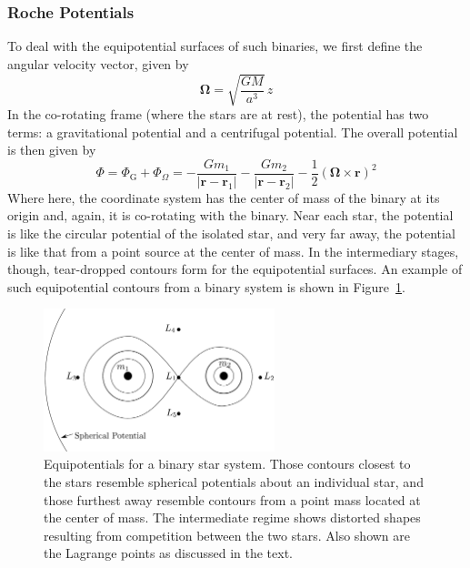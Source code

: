 \documentclass[10pt]{article}
\numberwithin{equation}{section}
\newcommand{\norm}[1]{\left\lvert#1\right\rvert}
\begin{document}
	\subsubsection{Roche Potentials} %
	\label{ssub:roche_potentials}
		To deal with the equipotential surfaces of such binaries, we first define the angular velocity vector, given by
		\begin{equation}
			\label{eq:binaries:7} \bm{\Omega} = \sqrt{\frac{GM}{a^3}}\,\hat{z}
		\end{equation}
		In the co-rotating frame (where the stars are at rest), the potential has two terms: a gravitational potential and a centrifugal potential. The overall potential is then given by
		\begin{equation}
			\label{eq:binaries:8} \Phi = \Phi_{\mathrm{G}} + \Phi_\Omega = -\frac{Gm_1}{\norm{\mathbf{r}-\mathbf{r}_1}} - \frac{G m_2}{\norm{\mathbf{r}-\mathbf{r}_2}} - \frac{1}{2}(\bm{\Omega}\times \mathbf{r})^2
		\end{equation}
		Where here, the coordinate system has the center of mass of the binary at its origin and, again, it is co-rotating with the binary. Near each star, the potential is like the circular potential of the isolated star, and very far away, the potential is like that from a point source at the center of mass. In the intermediary stages, though, tear-dropped contours form for the equipotential surfaces. An example of such equipotential contours from a binary system is shown in Figure~\ref{fig:binaries:2}.
		\begin{figure}[ht]
			\centering
			\includegraphics[width=0.6\textwidth]{figures/roche_potentials.pdf}
			\caption{Equipotentials for a binary star system. Those contours closest to the stars resemble spherical potentials about an individual star, and those furthest away resemble contours from a point mass located at the center of mass. The intermediate regime shows distorted shapes resulting from competition between the two stars. Also shown are the Lagrange points as discussed in the text.}
			\label{fig:binaries:2}
		\end{figure}
\end{document}
